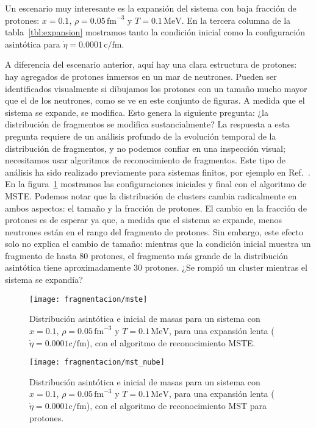 Un escenario muy interesante es la expansión del sistema con baja fracción de protones: $x = 0.1$, $\rho = 0.05\,\text{fm}^{-3}$ y $T = 0.1\,\text{MeV}$.
En la tercera columna de la tabla~\ref{tbl:expansion} mostramos tanto la condición inicial como la configuración asintótica para $\dot{\eta} = 0.0001\,\text{c/fm}$.

A diferencia del escenario anterior, aquí hay una clara estructura de protones: hay agregados de protones inmersos en un mar de neutrones.
Pueden ser identificados visualmente si dibujamos los protones con un tamaño mucho mayor que el de los neutrones, como se ve en este conjunto de figuras.
A medida que el sistema se expande, se modifica.
Esto genera la siguiente pregunta: ¿la distribución de fragmentos se modifica sustancialmente?
La respuesta a esta pregunta requiere de un análisis profundo de la evolución temporal de la distribución de fragmentos, y no podemos confiar en una inspección visual; necesitamos usar algoritmos de reconocimiento de fragmentos.
Este tipo de análisis ha sido realizado previamente para sistemas finitos, por ejemplo en Ref.~\cite{dorso_fluctuation_1994, strachan_fragment_1997}.
En la figura~\ref{fig:mste_pregnocchi} mostramos las configuraciones iniciales y final con el algoritmo de MSTE.\@
Podemos notar que la distribución de clusters cambia radicalmente en ambos aspectos: el tamaño y la fracción de protones.
El cambio en la fracción de protones es de esperar ya que, a medida que el sistema se expande, menos neutrones están en el rango del fragmento de protones.
Sin embargo, este efecto solo no explica el cambio de tamaño: mientras que la condición inicial muestra un fragmento de hasta 80 protones, el fragmento más grande de la distribución asintótica tiene aproximadamente 30 protones.
¿Se rompió un cluster mientras el sistema se expandía?

\begin{figure}
  \texttt{[image: fragmentacion/mste]}
  \caption{Distribución asintótica e inicial de masas para un sistema con $x = 0.1$, $\rho = 0.05\,\text{fm}^{-3}$ y $T = 0.1\,\text{MeV}$, para una expansión lenta ($\dot{\eta} = 0.0001\text{c/fm}$), con el algoritmo de reconocimiento MSTE.}
\label{fig:mste_pregnocchi}
\end{figure}

\begin{figure}
  \texttt{[image: fragmentacion/mst\_nube]}
  \caption{Distribución asintótica e inicial de masas para un sistema con $x = 0.1$, $\rho = 0.05\,\text{fm}^{-3}$ y $T = 0.1\,\text{MeV}$, para una expansión lenta ($\dot{\eta} = 0.0001\text{c/fm}$), con el algoritmo de reconocimiento MST para protones.}
\label{fig:mst_pregnocchi}
\end{figure}

